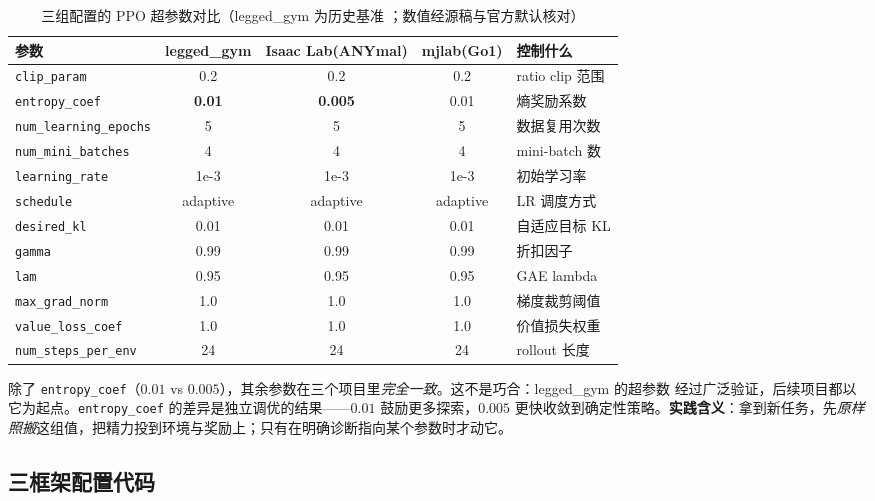\begin{table}[H]
\centering
\caption{三组配置的 PPO 超参数对比（legged\_gym 为历史基准 \cite{rudin2022legged}；数值经源稿与官方默认核对）}
\label{tab:rlmc-ppo-params}
\begin{tabular}{lcccl}
\hline
参数 & legged\_gym & Isaac Lab(ANYmal) & mjlab(Go1) & 控制什么 \\
\hline
\verb|clip_param| & 0.2 & 0.2 & 0.2 & ratio clip 范围 \\
\verb|entropy_coef| & \textbf{0.01} & \textbf{0.005} & 0.01 & 熵奖励系数 \\
\verb|num_learning_epochs| & 5 & 5 & 5 & 数据复用次数 \\
\verb|num_mini_batches| & 4 & 4 & 4 & mini-batch 数 \\
\verb|learning_rate| & 1e-3 & 1e-3 & 1e-3 & 初始学习率 \\
\verb|schedule| & adaptive & adaptive & adaptive & LR 调度方式 \\
\verb|desired_kl| & 0.01 & 0.01 & 0.01 & 自适应目标 KL \\
\verb|gamma| & 0.99 & 0.99 & 0.99 & 折扣因子 \\
\verb|lam| & 0.95 & 0.95 & 0.95 & GAE lambda \\
\verb|max_grad_norm| & 1.0 & 1.0 & 1.0 & 梯度裁剪阈值 \\
\verb|value_loss_coef| & 1.0 & 1.0 & 1.0 & 价值损失权重 \\
\verb|num_steps_per_env| & 24 & 24 & 24 & rollout 长度 \\
\hline
\end{tabular}
\end{table}

\begin{insight}\label{ins:rlmc-params-allequal}
除了 \verb|entropy_coef|（$0.01$ vs $0.005$），其余参数在三个项目里\emph{完全一致}。这不是巧合：legged\_gym 的超参数 \cite{rudin2022legged} 经过广泛验证，后续项目都以它为起点。\verb|entropy_coef| 的差异是独立调优的结果——$0.01$ 鼓励更多探索，$0.005$ 更快收敛到确定性策略。\textbf{实践含义}：拿到新任务，先\emph{原样照搬}这组值，把精力投到环境与奖励上；只有在明确诊断指向某个参数时才动它。
\end{insight}

\subsection{三框架配置代码}

